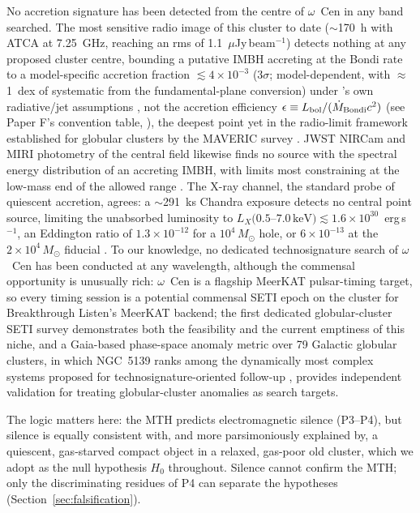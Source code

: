 \documentclass[11pt]{article}
\newcommand{\msun}{\ensuremath{M_\odot}}
\begin{document}
No accretion signature has been detected from the centre of $\omega$~Cen in any band searched. The most sensitive radio image of this cluster to date ($\sim$170~h with ATCA at 7.25~GHz, reaching an rms of 1.1~$\mu$Jy\,beam$^{-1}$) detects nothing at any proposed cluster centre, bounding a putative IMBH accreting at the Bondi rate to a model-specific accretion fraction $\lesssim 4\times10^{-3}$ ($3\sigma$; model-dependent, with $\approx$1~dex of systematic from the fundamental-plane conversion) under \citeauthor{Mahida2026}'s own radiative/jet assumptions \citep{Mahida2026}, not the accretion efficiency $\epsilon \equiv L_{\rm bol}/(\dot M_{\rm Bondi}c^{2})$ (see Paper F's convention table, \citealt{Swanson2026Accretion}), the deepest point yet in the radio-limit framework established for globular clusters by the MAVERIC survey \citep{Tremou2018}. JWST NIRCam and MIRI photometry of the central field likewise finds no source with the spectral energy distribution of an accreting IMBH, with limits most constraining at the low-mass end of the allowed range \citep{Chen2025JWST}. The X-ray channel, the standard probe of quiescent accretion, agrees: a $\sim$291~ks Chandra exposure detects no central point source, limiting the unabsorbed luminosity to $L_X(0.5$--$7.0\,\mathrm{keV}) \lesssim 1.6\times10^{30}$~erg\,s$^{-1}$, an Eddington ratio of $1.3\times10^{-12}$ for a $10^{4}\,\msun$ hole, or $6\times10^{-13}$ at the $2\times10^{4}\,\msun$ fiducial \citep{Haggard2013}. To our knowledge, no dedicated technosignature search of $\omega$~Cen has been conducted at any wavelength, although the commensal opportunity is unusually rich: $\omega$~Cen is a flagship MeerKAT pulsar-timing target, so every timing session is a potential commensal SETI epoch on the cluster for Breakthrough Listen's MeerKAT backend; the first dedicated globular-cluster SETI survey \citep[five northern clusters with FAST; $\omega$~Cen is inaccessible from FAST's latitude]{Huang2026} demonstrates both the feasibility and the current emptiness of this niche, and a Gaia-based phase-space anomaly metric over 79 Galactic globular clusters, in which NGC~5139 ranks among the dynamically most complex systems proposed for technosignature-oriented follow-up \citep{Huang2026Crystallization}, provides independent validation for treating globular-cluster anomalies as search targets.

The logic matters here: the MTH predicts electromagnetic silence (P3--P4), but silence is equally consistent with, and more parsimoniously explained by, a quiescent, gas-starved compact object in a relaxed, gas-poor old cluster, which we adopt as the null hypothesis $H_0$ throughout. Silence cannot confirm the MTH; only the discriminating residues of P4 can separate the hypotheses (Section~\ref{sec:falsification}).
\end{document}
